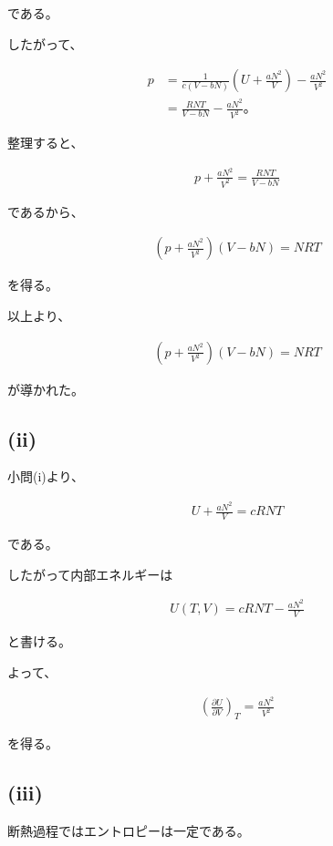 \documentclass[platex,dvipdfmx,a4paper]{jsarticle}
\begin{document}
である。

したがって、

\begin{align*}
p
&=
\frac{1}{c(V-bN)}
\left(
U+\frac{aN^2}{V}
\right)
-\frac{aN^2}{V^2} \\
&=
\frac{RNT}{V-bN}
-\frac{aN^2}{V^2}。
\end{align*}

整理すると、

\begin{align*}
p+\frac{aN^2}{V^2}
=
\frac{RNT}{V-bN}
\end{align*}

であるから、

\begin{align*}
\left(
p+\frac{aN^2}{V^2}
\right)
(V-bN)
=
NRT
\end{align*}

を得る。

以上より、

\begin{align*}
\left(
p+\frac{aN^2}{V^2}
\right)
(V-bN)
=
NRT
\end{align*}

が導かれた。

\subsection{(ii)}

小問(i)より、

\begin{align*}
U+\frac{aN^2}{V}
=
cRNT
\end{align*}

である。

したがって内部エネルギーは

\begin{align*}
U(T,V)
=
cRNT-\frac{aN^2}{V}
\end{align*}

と書ける。

よって、

\begin{align*}
\left(
\frac{\partial U}{\partial V}
\right)_T
=
\frac{aN^2}{V^2}
\end{align*}

を得る。

\subsection{(iii)}

断熱過程ではエントロピーは一定である。
\end{document}
